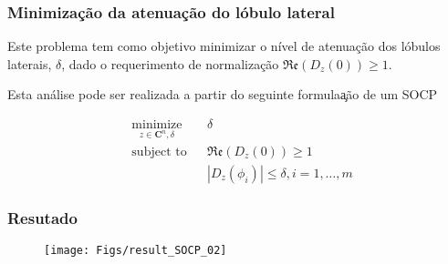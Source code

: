 \begin{frame}
\frametitle{ Minimização da atenuação do lóbulo lateral}
Este problema tem como objetivo minimizar o n\'ivel de atenuação dos lóbulos laterais, $\delta$, dado o requerimento de normalização $\mathfrak{Re}(D_{z}(0)) \geq 1$. 

Esta análise pode ser realizada a partir do seguinte  formula\c{a}\~ao de um SOCP 

\begin{equation*}
\begin{aligned}
& \underset{z \in \mathbf{C}^{n},\delta}{\text{minimize}}
&&\delta \\
& \text{subject to}
&& \mathfrak{Re}(D_{z}(0)) \geq 1 \\
&
&& |D_{z}(\phi_{i})| \leq \delta, i = 1, \ldots, m
\end{aligned}
\end{equation*}
\end{frame}

%

\begin{frame}
\frametitle{Resutado}
\begin{figure}
\centering
\texttt{[image: Figs/result\_SOCP\_02]}
\end{figure}
\end{frame}

